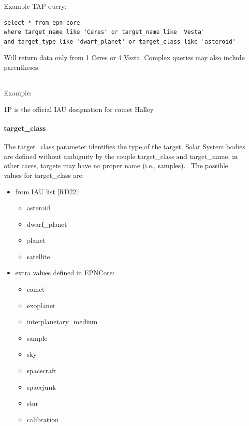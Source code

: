 \documentclass[11pt,a4paper]{ivoa}
\begin{document}
Example TAP query:






\begin{verbatim}
select * from epn_core 
where target_name like 'Ceres' or target_name like 'Vesta' 
and target_type like 'dwarf_planet' or target_class like 'asteroid'
\end{verbatim}




Will return data only from 1 Ceres or 4 Vesta. Complex queries may also include parentheses.

\\

Example:

1P is the official IAU designation for comet Halley

\paragraph{target\_class}

The target\_class parameter identifies the type of the target. Solar System bodies are defined without ambiguity by the couple target\_class and target\_name; in other cases, targets may have no proper name (i.e., samples).  The possible values for target\_class are:

\begin{itemize}
\item from IAU list [RD22]:\begin{itemize}
\item asteroid
\item dwarf\_planet
\item planet
\item satellite
\end{itemize}


\item extra values defined in EPNCore:\begin{itemize}
\item comet
\item exoplanet
\item interplanetary\_medium
\item sample
\item sky
\item spacecraft
\item spacejunk
\item star
\item calibration
\end{itemize}


\end{itemize}
\end{document}
